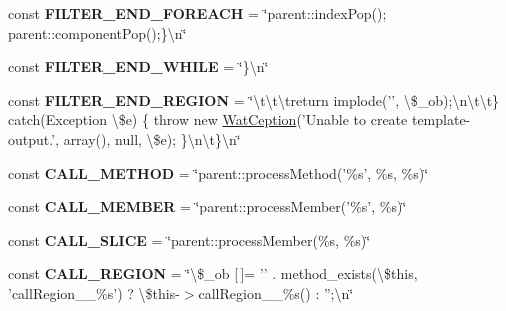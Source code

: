 \begin{DoxyCompactItemize}
\item 
\hypertarget{class_i_p_c_o___parser_settings_a35bf501cb5742f7b9b6ddfa51be6d10a}{const {\bfseries F\-I\-L\-T\-E\-R\-\_\-\-E\-N\-D\-\_\-\-F\-O\-R\-E\-A\-C\-H} = \char`\"{}parent\-::index\-Pop(); parent\-::component\-Pop();\}\textbackslash{}n\char`\"{}}\label{class_i_p_c_o___parser_settings_a35bf501cb5742f7b9b6ddfa51be6d10a}

\item 
\hypertarget{class_i_p_c_o___parser_settings_a11299ecef21dc9732ca33e9429274254}{const {\bfseries F\-I\-L\-T\-E\-R\-\_\-\-E\-N\-D\-\_\-\-W\-H\-I\-L\-E} = \char`\"{}\}\textbackslash{}n\char`\"{}}\label{class_i_p_c_o___parser_settings_a11299ecef21dc9732ca33e9429274254}

\item 
\hypertarget{class_i_p_c_o___parser_settings_a582a745983ed67996b5141007da8a63f}{const {\bfseries F\-I\-L\-T\-E\-R\-\_\-\-E\-N\-D\-\_\-\-R\-E\-G\-I\-O\-N} = \char`\"{}\textbackslash{}t\textbackslash{}t\textbackslash{}treturn implode('', \textbackslash{}\$\-\_\-ob);\textbackslash{}n\textbackslash{}t\textbackslash{}t\} catch(Exception \textbackslash{}\$e) \{ throw new \hyperlink{class_wat_ception}{Wat\-Ception}('Unable to create template-\/output.', array(), null, \textbackslash{}\$e); \}\textbackslash{}n\textbackslash{}t\}\textbackslash{}n\char`\"{}}\label{class_i_p_c_o___parser_settings_a582a745983ed67996b5141007da8a63f}

\item 
\hypertarget{class_i_p_c_o___parser_settings_a41a3d6b88d398a411c1e8e8f5f1c6bf1}{const {\bfseries C\-A\-L\-L\-\_\-\-M\-E\-T\-H\-O\-D} = \char`\"{}parent\-::process\-Method('\%s', \%s, \%s)\char`\"{}}\label{class_i_p_c_o___parser_settings_a41a3d6b88d398a411c1e8e8f5f1c6bf1}

\item 
\hypertarget{class_i_p_c_o___parser_settings_a36ee877d03dc8bb5e7bf064d6cc0f2bf}{const {\bfseries C\-A\-L\-L\-\_\-\-M\-E\-M\-B\-E\-R} = \char`\"{}parent\-::process\-Member('\%s', \%s)\char`\"{}}\label{class_i_p_c_o___parser_settings_a36ee877d03dc8bb5e7bf064d6cc0f2bf}

\item 
\hypertarget{class_i_p_c_o___parser_settings_a793613777db388e5e90169256f402b8a}{const {\bfseries C\-A\-L\-L\-\_\-\-S\-L\-I\-C\-E} = \char`\"{}parent\-::process\-Member(\%s, \%s)\char`\"{}}\label{class_i_p_c_o___parser_settings_a793613777db388e5e90169256f402b8a}

\item 
\hypertarget{class_i_p_c_o___parser_settings_aa481f13fb1af435c1dacfa1333ad2ead}{const {\bfseries C\-A\-L\-L\-\_\-\-R\-E\-G\-I\-O\-N} = \char`\"{}\textbackslash{}\$\-\_\-ob \mbox{[}$\,$\mbox{]}= '' . method\-\_\-exists(\textbackslash{}\$this, 'call\-Region\-\_\-\-\_\-\%s') ? \textbackslash{}\$this-\/$>$call\-Region\-\_\-\-\_\-\%s() \-: '';\textbackslash{}n\char`\"{}}\label{class_i_p_c_o___parser_settings_aa481f13fb1af435c1dacfa1333ad2ead}


\end{DoxyCompactItemize}
